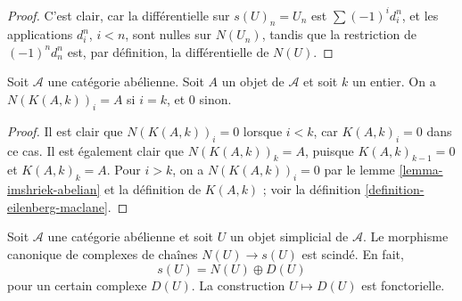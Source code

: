 \begin{proof}
C'est clair, car la différentielle sur $s(U)_n = U_n$ est
$\sum (-1)^i d^n_i$, et les applications $d^n_i$, $i < n$, sont nulles
sur $N(U_n)$, tandis que la restriction de $(-1)^nd^n_n$ est, par
définition, la différentielle de $N(U)$.
\end{proof}

\begin{lemma}
\label{lemma-N-K}
Soit $\mathcal{A}$ une catégorie abélienne. Soit $A$ un objet de
$\mathcal{A}$ et soit $k$ un entier. On a
$N(K(A, k))_i = A$ si $i = k$, et $0$ sinon.
\end{lemma}

\begin{proof}
Il est clair que $N(K(A, k))_i = 0$ lorsque $i < k$, car
$K(A, k)_i = 0$ dans ce cas. Il est également clair que
$N(K(A, k))_k = A$, puisque $K(A, k)_{k - 1} = 0$ et
$K(A, k)_k = A$. Pour $i > k$, on a $N(K(A, k))_i = 0$ par le lemme
\ref{lemma-imshriek-abelian} et la définition de $K(A, k)$ ; voir la
définition \ref{definition-eilenberg-maclane}.
\end{proof}

\begin{lemma}
\label{lemma-decompose-associated-complexes}
Soit $\mathcal{A}$ une catégorie abélienne et soit $U$ un objet
simplicial de $\mathcal{A}$. Le morphisme canonique de complexes de
chaînes $N(U) \to s(U)$ est scindé. En fait,
$$
s(U) = N(U) \oplus D(U)
$$
pour un certain complexe $D(U)$. La construction $U \mapsto D(U)$ est
fonctorielle.
\end{lemma}

